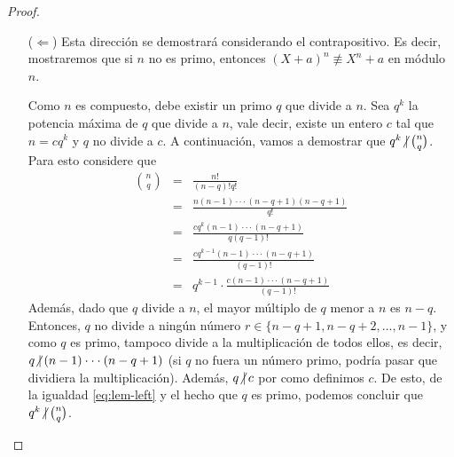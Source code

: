 \begin{proof}
\begin{itemize}
\item[($\Leftarrow$)]
			Esta dirección se demostrará considerando el contrapositivo. Es decir, mostraremos que si $n$ no es primo, entonces $ (X+a)^n \not\equiv X^n+a$ en módulo $n$.
			
			Como $n$ es compuesto, debe existir un primo $q$ %
			que %
			divide a $n$.
			Sea $q^k$ la potencia máxima de $q$ %
			que %
			divide a $n$, vale decir, existe un entero $ c $ tal que $n=cq^k$ y $q$ no divide a $c$. A continuación, vamos a demostrar que $q^k\text{$\not|$}\hspace{1.8pt}{n \choose q}$. Para %
			esto %
			considere que
			\begin{eqnarray}
				\nonumber {n \choose q} &=& \frac{n!}{(n-q)!q!}\\
				&=& \nonumber \frac{n(n-1)\cdot\cdot\cdot(n-q+1)(n-q+1)}{q!}\\
				&=&  \nonumber \frac{c q^k(n-1)\cdot\cdot\cdot(n-q+1)}{q(q-1)!}\\
				&=&\nonumber  \frac{c q^{k-1}(n-1)\cdot\cdot\cdot(n-q+1)}{(q-1)!}\\
				&=& q^{k-1}\cdot \frac{c (n-1)\cdot\cdot\cdot (n-q+1)}{(q-1)!} \label{eq:lem-left}
			\end{eqnarray}	
			Además, dado que $q$ divide a $n$, el 
			mayor múltiplo de $q$ menor a $n$ es $n-q$. 
			Entonces, $q$ no divide a ningún número $r\in\{n-q+1,n-q+2,...,n-1\}$, y como $q$ es primo, tampoco divide a la multiplicación de todos ellos, es decir, $q\text{$\not|$}\hspace{1.8pt} (n-1)\cdot\cdot\cdot(n-q+1)$ (si $q$ no fuera un número primo, podría pasar que dividiera la multiplicación). Además, $q\text{$\not|$}\hspace{1.8pt} c$ por como definimos $c$. De esto, de la igualdad \eqref{eq:lem-left} y el hecho que $q$ es primo, podemos concluir que $q^k\text{$\not|$}\hspace{1.8pt} {n\choose q}$.
			

\end{itemize}
\end{proof}
